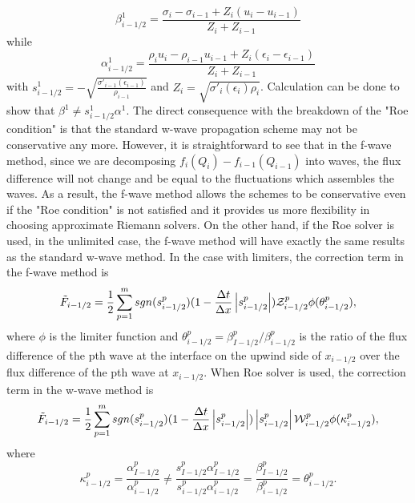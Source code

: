 \documentclass{article}
\providecommand{\abs}[1]{\left|#1\right|}
\begin{document}
\[
\beta^1_{i-1/2}=\frac{\sigma_i-\sigma_{i-1}+{ Z}_i(u_i-u_{i-1})}{{ Z}_i+{ Z}_{i-1}}
\]
while
\[
\alpha^1_{i-1/2}=\frac{\rho_i u_i-\rho_{i-1}u_{i-1}+Z_i(\epsilon_i-\epsilon_{i-1})}{Z_i+Z_{i-1}}
\]
with $s^1_{i-1/2}=-\sqrt{\frac{\sigma'_{i-1}(\epsilon_{i-1})}{\rho_{i-1}}}$
and $Z_i=\sqrt{\sigma'_{i}(\epsilon_{i})\rho_{i}}$. Calculation can be done to show that $ \beta^1 \neq s^1_{i-1/2} \alpha^1$. The direct consequence with the breakdown of the "Roe condition" is that the standard w-wave propagation scheme may not be conservative any more. However, it is straightforward to see that in the f-wave method, since we are decomposing $f_{i}(Q_i)-f_{i-1}(Q_{i-1})$ into waves, the flux difference will not change and be equal to the fluctuations which assembles the waves. As a result, the f-wave method allows the schemes to be conservative even if the "Roe condition" is not satisfied and it provides us more flexibility in choosing approximate Riemann solvers. On the other hand, if the Roe solver is used, in the unlimited case, the f-wave method will have exactly the same results as the standard w-wave method. In the case with limiters, the correction term in the f-wave method is
\begin{align}
\tilde{F}_{i-1/2}=\frac{1}{2}\sum_{p=1}^{m} sgn(s_{i-1/2}^{p})(1-\frac{\Delta t}{\Delta x}\abs{s^p_{i-1/2}}){\cal Z}^p_{i-1/2} \phi(\theta^p_{i-1/2}),
\label{flimiter}
\end{align}
where $\phi$ is the limiter function and $\theta^p_{i-1/2}=\beta^p_{I-1/2}/\beta^p_{i-1/2}$ is the ratio of the flux difference of the pth wave at the interface on the upwind side of $x_{i-1/2}$ over the flux difference of the pth wave at $x_{i-1/2}$. When Roe solver is used, the correction term in the w-wave method is
\begin{align}
\tilde{F}_{i-1/2}=\frac{1}{2}\sum_{p=1}^{m} sgn(s_{i-1/2}^{p})(1-\frac{\Delta t}{\Delta x}\abs{s^p_{i-1/2}})\abs{s_{i-1/2}^p}{\cal W}^p_{i-1/2} \phi(\kappa^p_{i-1/2}),
\end{align}
where
\[
\kappa^p_{i-1/2}=\frac{\alpha^p_{I-1/2}}{\alpha^p_{i-1/2}}
\neq
\frac{s^p_{I-1/2}\alpha^p_{I-1/2}}{s^p_{i-1/2}\alpha^p_{i-1/2}}
=\frac{\beta^p_{I-1/2}}{\beta^p_{i-1/2}}=\theta^p_{i-1/2}.
\]
\end{document}
